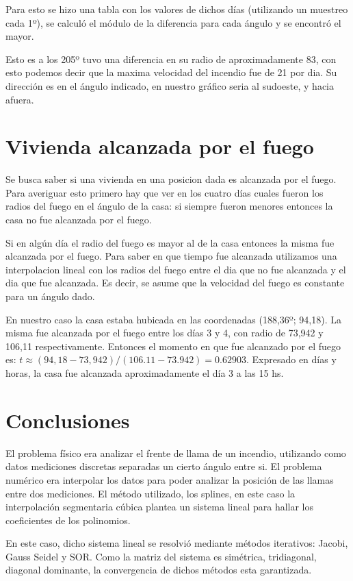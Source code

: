 \documentclass[12pt,spanish]{article}
\begin{document}
Para esto se hizo una tabla con los valores de dichos días (utilizando un muestreo cada 1º), se calculó el módulo de la diferencia para cada ángulo y se encontró el mayor.

Esto es a los 205º tuvo una diferencia en su radio de aproximadamente 83, con esto podemos decir que la maxima velocidad del incendio fue de 21 por dia.
Su dirección es en el ángulo indicado, en nuestro gráfico seria al sudoeste, y hacia afuera. 

\section*{Vivienda alcanzada por el fuego}
Se busca saber si una vivienda en una posicion dada es alcanzada por el fuego.
Para averiguar esto primero hay que ver en los cuatro días cuales fueron los radios del fuego en el ángulo de la casa: si siempre fueron menores entonces la casa no fue alcanzada por el fuego.

Si en algún día el radio del fuego es mayor al de la casa entonces la misma fue alcanzada por el fuego. Para saber en que tiempo fue alcanzada utilizamos una interpolacion lineal con los radios del fuego entre el dia que no fue alcanzada y el dia que fue alcanzada. Es decir, se asume que la velocidad del fuego es constante para un ángulo dado.

En nuestro caso la casa estaba hubicada en las coordenadas (188,36º; 94,18). La misma fue alcanzada por el fuego entre los días 3 y 4, con radio de 73,942 y 106,11 respectivamente.
Entonces el momento en que fue alcanzado por el fuego es: $t \approx (94,18 - 73,942)/(106.11 - 73.942) = 0.62903$.
Expresado en días y horas, la casa fue alcanzada aproximadamente el día 3 a las 15 hs.

\section*{Conclusiones}
El problema físico era analizar el frente de llama de un incendio, utilizando como datos mediciones discretas separadas un cierto ángulo entre si. El problema numérico era interpolar los datos para poder analizar la posición de las llamas entre dos mediciones. El método utilizado, los splines, en este caso la interpolación segmentaria cúbica plantea un sistema lineal para hallar los coeficientes de los polinomios. 

En este caso, dicho sistema lineal se resolvió mediante métodos iterativos: Jacobi, Gauss Seidel y SOR. Como la matriz del sistema es simétrica, tridiagonal, diagonal dominante, la convergencia de dichos métodos esta garantizada.
\end{document}
